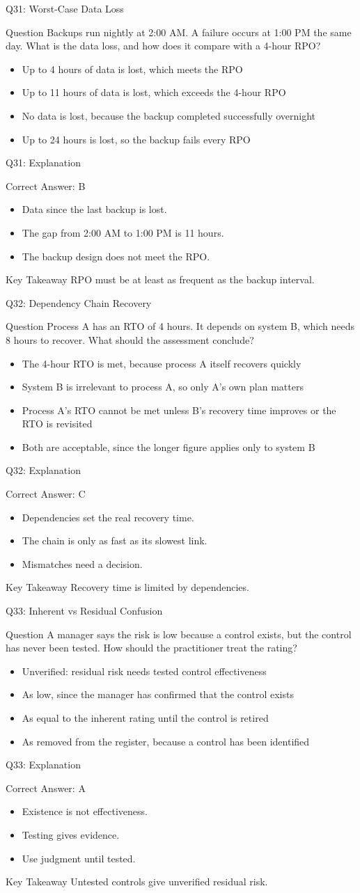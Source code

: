 \documentclass[aspectratio=169]{beamer}
\newcommand{\hq}[7]{%
	\begin{frame}{Q#1: #2}
		\begin{block}{Question}
			#3
		\end{block}
		\begin{itemize}
			#4
		\end{itemize}
	\end{frame}
	\begin{frame}{Q#1: Explanation}
		\begin{block}{Correct Answer: #5}
			\begin{itemize}
				#6
			\end{itemize}
		\end{block}
		\begin{alertblock}{Key Takeaway}
			#7
		\end{alertblock}
	\end{frame}
}
\begin{document}
	\hq{31}{Worst-Case Data Loss}
	{Backups run nightly at 2:00 AM. A failure occurs at 1:00 PM the same day. What is the data loss, and how does it compare with a 4-hour RPO?}
	{\item[\textbf{(A)}] Up to 4 hours of data is lost, which meets the RPO
		\item[\textbf{(B)}] Up to 11 hours of data is lost, which exceeds the 4-hour RPO
		\item[\textbf{(C)}] No data is lost, because the backup completed successfully overnight
		\item[\textbf{(D)}] Up to 24 hours is lost, so the backup fails every RPO}
	{B}
	{\item Data since the last backup is lost.
		\item The gap from 2:00 AM to 1:00 PM is 11 hours.
		\item The backup design does not meet the RPO.}
	{RPO must be at least as frequent as the backup interval.}

	\hq{32}{Dependency Chain Recovery}
	{Process A has an RTO of 4 hours. It depends on system B, which needs 8 hours to recover. What should the assessment conclude?}
	{\item[\textbf{(A)}] The 4-hour RTO is met, because process A itself recovers quickly
		\item[\textbf{(B)}] System B is irrelevant to process A, so only A's own plan matters
		\item[\textbf{(C)}] Process A's RTO cannot be met unless B's recovery time improves or the RTO is revisited
		\item[\textbf{(D)}] Both are acceptable, since the longer figure applies only to system B}
	{C}
	{\item Dependencies set the real recovery time.
		\item The chain is only as fast as its slowest link.
		\item Mismatches need a decision.}
	{Recovery time is limited by dependencies.}

	\hq{33}{Inherent vs Residual Confusion}
	{A manager says the risk is low because a control exists, but the control has never been tested. How should the practitioner treat the rating?}
	{\item[\textbf{(A)}] Unverified: residual risk needs tested control effectiveness
		\item[\textbf{(B)}] As low, since the manager has confirmed that the control exists
		\item[\textbf{(C)}] As equal to the inherent rating until the control is retired
		\item[\textbf{(D)}] As removed from the register, because a control has been identified}
	{A}
	{\item Existence is not effectiveness.
		\item Testing gives evidence.
		\item Use judgment until tested.}
	{Untested controls give unverified residual risk.}
\end{document}
